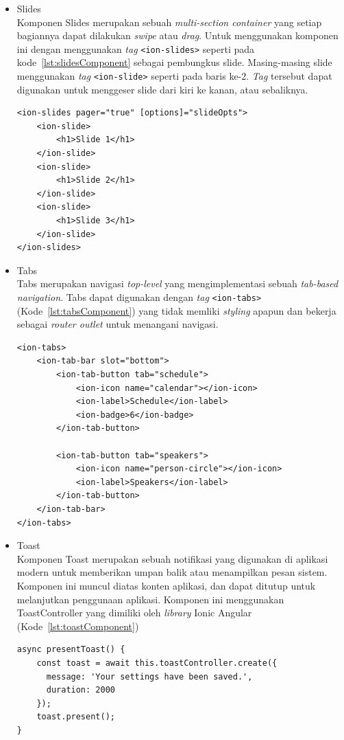\begin{itemize}
	\item Slides \\
	Komponen Slides merupakan sebuah \textit{multi-section container} yang setiap bagiannya dapat dilakukan \textit{swipe} atau \textit{drag}. Untuk menggunakan komponen ini dengan menggunakan \textit{tag} \texttt{<ion-slides>} seperti pada kode~\ref{lst:slidesComponent} sebagai pembungkus slide. Masing-masing slide menggunakan \textit{tag} \texttt{<ion-slide>} seperti pada baris ke-2. \textit{Tag} tersebut dapat digunakan untuk menggeser slide dari kiri ke kanan, atau sebaliknya.


	
\begin{lstlisting}[label={lst:slidesComponent}, caption=Kode Program dari Slides]
<ion-slides pager="true" [options]="slideOpts">
	<ion-slide>
		<h1>Slide 1</h1>
	</ion-slide>
	<ion-slide>
		<h1>Slide 2</h1>
	</ion-slide>
	<ion-slide>
		<h1>Slide 3</h1>
	</ion-slide>
</ion-slides>
\end{lstlisting}
	
	\item Tabs \\
	Tabs merupakan navigasi {\it top-level} yang mengimplementasi sebuah {\it tab-based navigation}. Tabs dapat digunakan dengan {\it tag} \texttt{<ion-tabs>} (Kode~\ref{lst:tabsComponent}) yang tidak memliki {\it styling} apapun dan bekerja sebagai {\it router outlet} untuk menangani navigasi. 
\begin{lstlisting}[label={lst:tabsComponent}, caption=Kode Program dari Tabs]
<ion-tabs>
	<ion-tab-bar slot="bottom">
		<ion-tab-button tab="schedule">
			<ion-icon name="calendar"></ion-icon>
			<ion-label>Schedule</ion-label>
			<ion-badge>6</ion-badge>
		</ion-tab-button>

		<ion-tab-button tab="speakers">
			<ion-icon name="person-circle"></ion-icon>
			<ion-label>Speakers</ion-label>
		</ion-tab-button>
	</ion-tab-bar>
</ion-tabs>
\end{lstlisting}
		
	\item Toast \\
	Komponen Toast merupakan sebuah notifikasi yang digunakan di aplikasi modern untuk memberikan umpan balik atau menampilkan pesan sistem. Komponen ini muncul diatas konten aplikasi, dan dapat ditutup untuk melanjutkan penggunaan aplikasi. Komponen ini menggunakan ToastController yang dimiliki oleh \textit{library} Ionic Angular (Kode~\ref{lst:toastComponent}) 

\begin{lstlisting}[label={lst:toastComponent}, caption=Kode Program dari Toast]
async presentToast() {
    const toast = await this.toastController.create({
      message: 'Your settings have been saved.',
      duration: 2000
    });
    toast.present();
}
\end{lstlisting}
		


\end{itemize}
